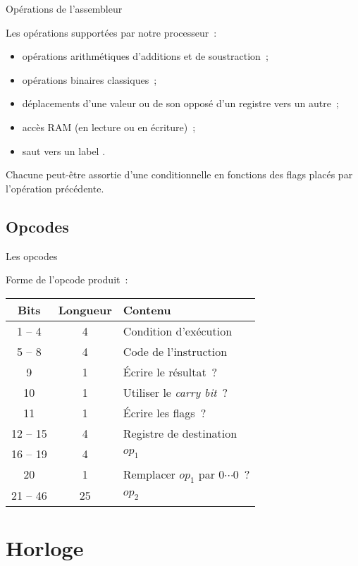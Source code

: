 \documentclass[11pt]{beamer}
\begin{document}
\begin{frame}{Opérations de l'assembleur}

Les opérations supportées par notre processeur~:

\begin{itemize}
\item opérations arithmétiques d'additions et de soustraction~;
\item opérations binaires classiques~;
\item déplacements d'une valeur ou de son opposé d'un registre vers un autre~;
\item accès RAM (en lecture ou en  écriture)~;
\item saut vers un label .
\end{itemize}

Chacune peut-être assortie d'une conditionnelle en fonctions des flags placés par l'opération précédente.

\end{frame}

\subsection{Opcodes}

\begin{frame}{Les opcodes}

Forme de l'opcode produit~:

\begin{tabular}{|c|c|l|}
\hline
\textbf{Bits} & \textbf{Longueur} & \textbf{Contenu}\\
\hline
1 -- 4 & 4 & Condition d'exécution \\
5 -- 8 & 4 & Code de l'instruction \\
9 & 1 & Écrire le résultat~? \\
10 & 1 & Utiliser le \textit{carry bit}~?  \\
11 & 1 & Écrire les flags~? \\
12 -- 15 & 4 & Registre de destination \\
16 -- 19 & 4 & $op_1$ \\
20 & 1 & Remplacer $op_1$ par $0\cdots 0$~? \\
21 -- 46 & 25 & $op_2$ \\ \hline
\end{tabular}

\end{frame}

\section{Horloge}
\end{document}
